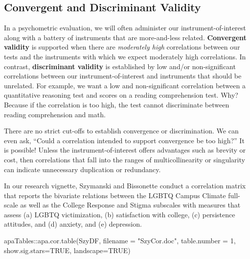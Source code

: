 \documentclass[
  english,
]{book}
\newenvironment{Shaded}{\begin{snugshade}}{\end{snugshade}}
\newcommand{\AttributeTok}[1]{\textcolor[rgb]{0.77,0.63,0.00}{#1}}
\newcommand{\ConstantTok}[1]{\textcolor[rgb]{0.00,0.00,0.00}{#1}}
\newcommand{\DecValTok}[1]{\textcolor[rgb]{0.00,0.00,0.81}{#1}}
\newcommand{\FunctionTok}[1]{\textcolor[rgb]{0.00,0.00,0.00}{#1}}
\newcommand{\NormalTok}[1]{#1}
\newcommand{\SpecialCharTok}[1]{\textcolor[rgb]{0.00,0.00,0.00}{#1}}
\newcommand{\StringTok}[1]{\textcolor[rgb]{0.31,0.60,0.02}{#1}}
\begin{document}
\hypertarget{convergent-and-discriminant-validity}{%
\subsection{Convergent and Discriminant Validity}\label{convergent-and-discriminant-validity}}

In a psychometric evaluation, we will often administer our instrument-of-interest along with a battery of instruments that are more-and-less related. \textbf{Convergent validity} is supported when there are \emph{moderately high} correlations between our tests and the instruments with which we expect moderately high correlations. In contrast, \textbf{discriminant validity} is established by low and/or non-significant correlations between our instrument-of-interest and instruments that should be unrelated. For example, we want a low and non-significant correlation between a quantitative reasoning test and scores on a reading comprehension test. Why? Because if the correlation is too high, the test cannot discriminate between reading comprehension and math.

There are no strict cut-offs to establish convergence or discrimination. We can even ask, ``Could a correlation intended to support convergence be too high?'' It is possible! Unless the instrument-of-interest offers advantages such as brevity or cost, then correlations that fall into the ranges of multicollinearity or singularity can indicate unnecessary duplication or redundancy.

In our research vignette, Szymanski and Bissonette \citeyearpar{szymanski_perceptions_2020} conduct a correlation matrix that reports the bivariate relations between the LGBTQ Campus Climate full-scale as well as the College Response and Stigma subscales with measures that assess (a) LGBTQ victimization, (b) satisfaction with college, (c) persistence attitudes, and (d) anxiety, and (e) depression.

\begin{Shaded}
\begin{Highlighting}[]
\NormalTok{apaTables}\SpecialCharTok{::}\FunctionTok{apa.cor.table}\NormalTok{(SzyDF, }\AttributeTok{filename =} \StringTok{"SzyCor.doc"}\NormalTok{, }\AttributeTok{table.number =} \DecValTok{1}\NormalTok{, }\AttributeTok{show.sig.stars=}\ConstantTok{TRUE}\NormalTok{, }\AttributeTok{landscape=}\ConstantTok{TRUE}\NormalTok{)}
\end{Highlighting}
\end{Shaded}
\end{document}
